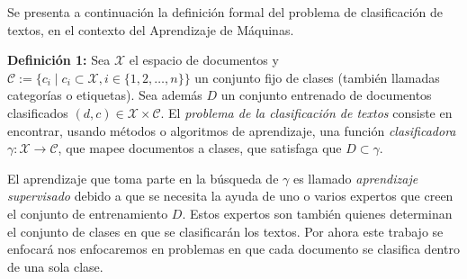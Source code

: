 \documentclass[t,compress,10pt,xcolor=dvipsnames]{beamer}
\begin{document}
{		\framebreak
		
		Se presenta a continuaci\'on la definici\'on formal del problema de clasificaci\'on de textos, en el contexto del Aprendizaje de M\'aquinas.
		
		\vspace{.5em}
		
		\textbf{Definici\'on 1:}
			Sea $\mathcal{{X}}$ el espacio de documentos y $\mathcal{C} := \{c_i \mid c_i \subset \mathcal{X}, i \in \{ 1,2,\dots,n\} \}$ un conjunto fijo de clases (tambi\'en llamadas categor\'ias o etiquetas). Sea adem\'as $D$ un conjunto entrenado de documentos clasificados $(d,c) \in \mathcal X \times \mathcal{C}$. El \emph{problema de la clasificaci\'on de textos} consiste en encontrar, usando m\'etodos o algoritmos de aprendizaje, una funci\'on \emph{clasificadora} $\gamma : \mathcal{X} \rightarrow \mathcal{C}$, que mapee documentos a clases, que satisfaga que $D \subset \gamma$. 	
		
		\framebreak
		
		El aprendizaje que toma parte en la b\'usqueda de $\gamma$ es llamado \emph{aprendizaje supervisado} debido a que se necesita la ayuda de uno o varios expertos que creen el conjunto de entrenamiento $D$. Estos expertos son  tambi\'en quienes determinan el conjunto de clases en que se clasificar\'an los textos. Por ahora este trabajo se enfocar\'a nos enfocaremos en problemas en que cada documento se clasifica dentro de una sola clase.
		
	
	}
	
\end{document}
